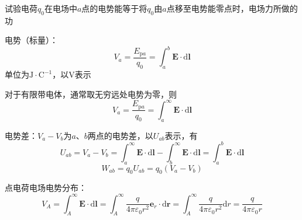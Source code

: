\documentclass[12pt, a4paper, twoside]{ctexbook}
\begin{document}
试验电荷$q_0$在电场中$a$点的电势能等于将$q_0$由$a$点移至电势能零点时，电场力所做的功

{\sonti 电势（标量）}：
$$
V_a=\frac{E_{\mathrm{p}a}}{q_0}=\int_{a}^{b} \boldsymbol{E}\cdot\mathrm{d}\boldsymbol{l}
$$
单位为$\mathrm{J}\cdot\mathrm{C}^{-1}$，以$\mathrm{V}$表示

对于有限带电体，通常取无穷远处电势为零，则
$$
V_a=\frac{E_{\mathrm{p}a}}{q_0}=\int_{a}^{\infty} \boldsymbol{E}\cdot\mathrm{d}\boldsymbol{l}
$$

{\sonti 电势差}：$V_a-V_b$为$a$、$b$两点的电势差，以$U_{ab}$表示，有
$$
U_{ab}=V_a-V_b=\int_{a}^{\infty} \boldsymbol{E}\cdot\mathrm{d}\boldsymbol{l}-\int_{b}^{\infty} \boldsymbol{E}\cdot\mathrm{d}\boldsymbol{l}=\int_{a}^{b} \boldsymbol{E}\cdot\mathrm{d}\boldsymbol{l}
$$
$$
W_{ab}=q_0U_{ab}=q_0\left(V_a-V_b\right)
$$

{\sonti 点电荷电场电势分布}：
$$
V_A=\int_{A}^{\infty} \boldsymbol{E}\cdot\mathrm{d}\boldsymbol{l}=\int_{A}^{\infty}\frac{q}{4\pi\varepsilon_0r^2}\boldsymbol{e}_r\cdot\mathrm{d}\boldsymbol{r}=\int_{A}^{\infty}\frac{q}{4\pi\varepsilon_0r^2}\mathrm{d}r=\frac{q}{4\pi\varepsilon_0r}
$$
\end{document}

